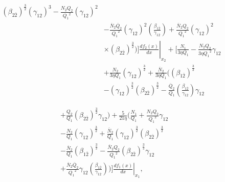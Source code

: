 \documentclass[preprint,12pt]{elsarticle}
\begin{document}
\begin{equation*}
\begin{split}
(\beta_{2\overline{2}})^\frac{3}{2} (\gamma_{12})^3    - \frac{N_2 Q_2}{{Q_1}^2} (\gamma_{12})^2 \\ & - \frac{\overline{N}_{2} \overline{Q}_{2}}{{Q_1}^2} (\gamma_{12})^2  \left(\frac{\beta_{1\overline{2}}}{\gamma_{12}}\right)  + \frac{\overline{N}_{2} Q_2}{{Q_1}^2} (\gamma_{12})^2 \\ & \times \left. (\beta_{2\overline{2}})^\frac{3}{2} \Biggr) \Biggr] \frac{df_2(x)}{dx} \right|_{x_2} + \Biggl[ \frac{N_1}{3 \eta Q_1} - \frac{N_2 Q_2}{3 \eta {Q_1}^2} \gamma_{12} \\ & + \frac{N_{2}}{3\eta Q_{1}} (\gamma_{12})^\frac{3}{2} + \frac{\overline{N}_{2}}{3 \eta Q_1} \Biggl( (\beta_{1\overline{2}})^\frac{3}{2} \\ & - (\gamma_{12})^\frac{3}{2} (\beta_{2\overline{2}})^\frac{3}{2} - \frac{\overline{Q}_{2}}{Q_1}  \left(\frac{\beta_{1\overline{2}}}{\gamma_{12}}\right) \gamma_{12}  
              \end{split}
              \end{equation*}
               
              \begin{equation}
              \begin{split}
              & +  \frac{Q_2}{Q_1} (\beta_{2\overline{2}})^\frac{3}{2} \gamma_{12} \Biggr)  + \frac{5}{21 \eta} \Biggl( \frac{N_1}{Q_1} + \frac{N_2 Q_2}{{Q_1}^2} \gamma_{12} \\ & - \frac{N_2}{Q_1} (\gamma_{12})^\frac{3}{2}   + \frac{\overline{N}_{2}}{Q_1} (\gamma_{12})^\frac{3}{2} (\beta_{2\overline{2}})^\frac{3}{2}  \\ & - \frac{\overline{N}_{2}}{Q_1} (\beta_{1\overline{2}})^\frac{3}{2} -  \frac{\overline{N}_{2} Q_2}{{Q_1}^2} (\beta_{2\overline{2}})^\frac{3}{2} \gamma_{12} \\ & + \frac{\overline{N}_{2} \overline{Q}_{2}}{{Q_1}^2} \gamma_{12}  \left(\frac{\beta_{1\overline{2}}}{\gamma_{12}}\right) \Biggr) \left. \Biggr] \frac{df_1(x)}{dx}\right|_{x_1},
             \label{eqn:k11_caseI}
            \end{split}
            \end{equation}
\end{document}

